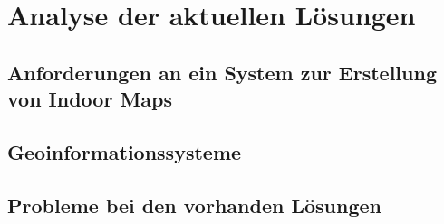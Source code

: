 \chapter{Analyse der aktuellen Lösungen}
\label{ch:analysis}

\section{Anforderungen an ein System zur Erstellung von Indoor Maps}

\section{Geoinformationssysteme}

\section{Probleme bei den vorhanden Lösungen}
